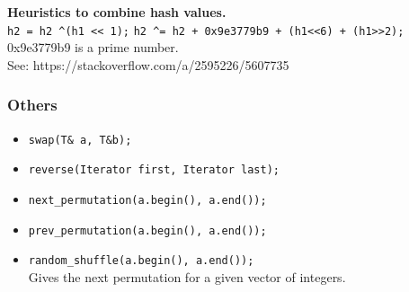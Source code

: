 \textbf{Heuristics to combine hash values.}\\
\texttt{h2 = h2 \textasciicircum (h1 << 1);}
\texttt{h2 \textasciicircum= h2 + 0x9e3779b9 + (h1<<6) + (h1>>2);}\\
0x9e3779b9 is a prime number.\\
See: https://stackoverflow.com/a/2595226/5607735\\


\subsubsection{Others}

\begin{itemize}
\item \texttt{swap(T\& a, T\&b);}\\
\item \texttt{reverse(Iterator first, Iterator last);}
\item \texttt{next\_permutation(a.begin(), a.end());}\\
\item \texttt{prev\_permutation(a.begin(), a.end());}\\
\item \texttt{random\_shuffle(a.begin(), a.end());}\\
Gives the next permutation for a given vector of integers.
\end{itemize}

\vfill \null
\columnbreak 

